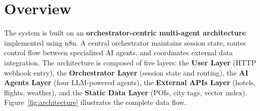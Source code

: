 \documentclass[12pt,a4paper]{report}
\begin{document}
\section{Overview}

The system is built on an \textbf{orchestrator-centric multi-agent architecture} implemented using
n8n. A central orchestrator maintains session state, routes control flow between specialized AI
agents, and coordinates external data integration. The architecture is composed of five layers:
the \textbf{User Layer} (HTTP webhook entry), the \textbf{Orchestrator Layer} (session state and
routing), the \textbf{AI Agents Layer} (four LLM-powered agents), the \textbf{External APIs Layer}
(hotels, flights, weather), and the \textbf{Static Data Layer} (POIs, city tags, vector index).
Figure~\ref{fig:architecture} illustrates the complete data flow.
\end{document}
